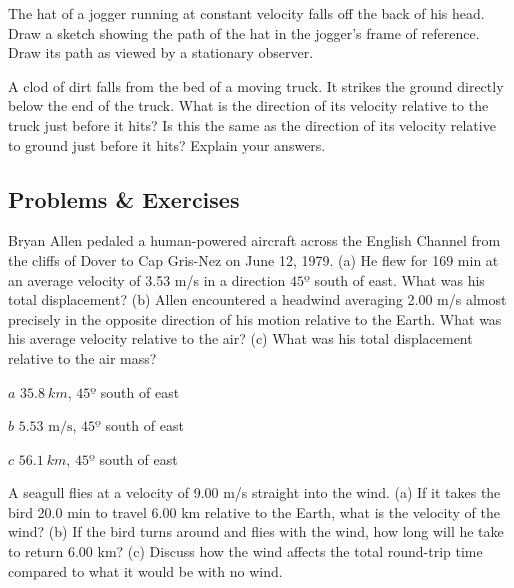 \documentclass[
]{book}
\begin{document}
\hypertarget{fs-id1912925}{}
\leavevmode{}%
The hat of a jogger running at constant velocity falls off the back of
his head. Draw a sketch showing the path of the hat in the jogger's
frame of reference. Draw its path as viewed by a stationary observer.

\hypertarget{fs-id1551935}{}
\leavevmode{}%
A clod of dirt falls from the bed of a moving truck. It strikes the
ground directly below the end of the truck. What is the direction of its
velocity relative to the truck just before it hits? Is this the same as
the direction of its velocity relative to ground just before it hits?
Explain your answers.

\hypertarget{fs-id1804537}{}
\hypertarget{problems-exercises-9}{%
\subsection{Problems \& Exercises}\label{problems-exercises-9}}

\hypertarget{fs-id1533507}{}
\leavevmode{}%
Bryan Allen pedaled a human-powered aircraft across the English Channel
from the cliffs of Dover to Cap Gris-Nez on June 12, 1979. (a) He flew
for 169 min at an average velocity of 3.53 m/s in a direction
\(\text{45º}{}\) south of east. What was his total displacement? (b) Allen
encountered a headwind averaging 2.00 m/s almost precisely in the
opposite direction of his motion relative to the Earth. What was his
average velocity relative to the air? (c) What was his total
displacement relative to the air mass?

\leavevmode{}%
\(a\) \({\text{35}\text{.}8\ km}{}\), \(\text{45º}{}\) south of east

\(b\) \({5\text{.}\text{53\ m/s}}{}\), \(\text{45º}{}\) south of east

\(c\) \({\text{56}\text{.}1\ km}{}\), \(\text{45º}{}\) south of east

\hypertarget{eip-342}{}
\leavevmode{}%
A seagull flies at a velocity of 9.00 m/s straight into the wind. (a) If
it takes the bird 20.0 min to travel 6.00 km relative to the Earth, what
is the velocity of the wind? (b) If the bird turns around and flies with
the wind, how long will he take to return 6.00 km? (c) Discuss how the
wind affects the total round-trip time compared to what it would be with
no wind.
\end{document}
